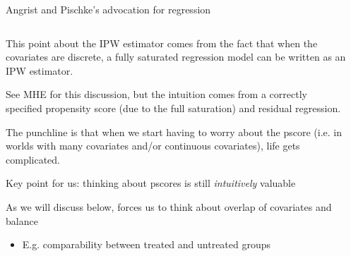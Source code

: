 \documentclass[notes,11pt, aspectratio=169]{beamer}
\newenvironment{wideitemize}{\itemize\addtolength{\itemsep}{10pt}}{\enditemize}
\begin{document}
\begin{frame}{Angrist and Pischke's advocation for regression}
\begin{columns}[T] %
  \begin{column}{.65\textwidth}
    \begin{wideitemize}
    \item This point about the IPW estimator comes from the fact that
      when the covariates are discrete, a fully saturated regression
      model can be written as an IPW estimator.
    \item See MHE for this discussion, but the intuition comes from a
      correctly specified propensity score (due to the full
      saturation) and residual regression.
    \item The punchline is that when we start having to worry about
      the pscore (i.e. in worlds with many covariates and/or
      continuous covariates), life gets complicated.
    \item Key point for us: thinking about pscores is still
      \emph{intuitively} valuable
    \item As we will discuss below, forces us to think about overlap of covariates and balance
      \begin{itemize}
      \item E.g. comparability between treated and untreated groups
      \end{itemize}
    \end{wideitemize}
\end{column}%
\hfill%
\begin{column}{.35\textwidth}

\end{column}
\end{columns}
\end{frame}
\end{document}
